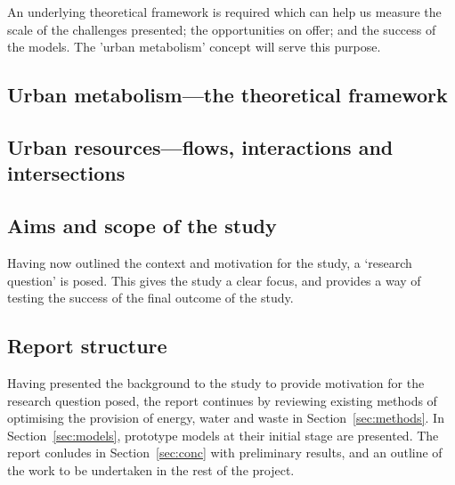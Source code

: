 An underlying theoretical framework is required which can help us measure the scale of the challenges presented; the opportunities on offer; and the success of the models. The 'urban metabolism' concept will serve this purpose.

\subsection{Urban metabolism---the theoretical framework}

\subsection{Urban resources---flows, interactions and intersections}

\subsection{Aims and scope of the study}
Having now outlined the context and motivation for the study, a `research question' is posed. This gives the study a clear focus, and provides a way of testing the success of the final outcome of the study.


\subsection{Report structure}
Having presented the background to the study to provide motivation for the research question posed, the report continues by reviewing existing methods of optimising the provision of energy, water and waste in Section~\ref{sec:methods}. In Section~\ref{sec:models}, prototype models at their initial stage are presented. The report conludes in Section~\ref{sec:conc} with preliminary results, and an outline of the work to be undertaken in the rest of the project.
